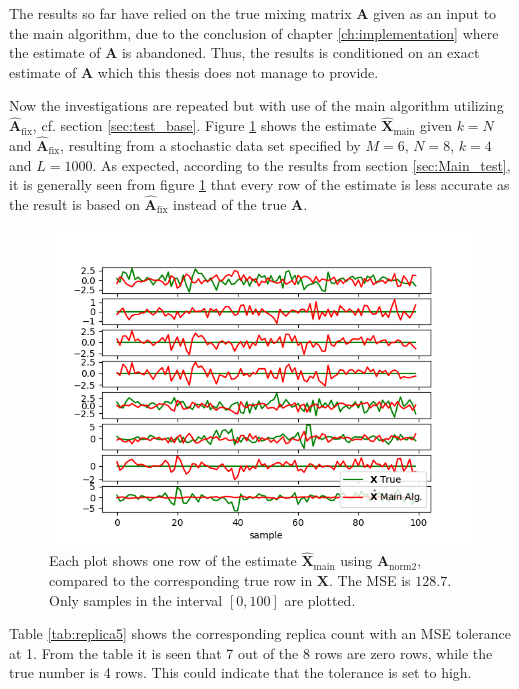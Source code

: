 \noindent
The results so far have relied on the true mixing matrix $\mathbf{A}$ given as an input to the main algorithm, due to the conclusion of chapter \ref{ch:implementation} where the estimate of $\mathbf{A}$ is abandoned. 
Thus, the results is conditioned on an exact estimate of $\mathbf{A}$ which this thesis does not manage to provide.

Now the investigations are repeated but with use of the main algorithm utilizing $\hat{\mathbf{A}}_{\text{fix}}$, cf. section \ref{sec:test_base}.
Figure \ref{fig:ktest5} shows the estimate $\hat{\mathbf{X}}_{\text{main}}$ given $k=N$ and $\hat{\textbf{A}}_{\text{fix}}$, resulting from a stochastic data set specified by $M = 6$, $N = 8$, $k = 4$ and $L = 1000$.
As expected, according to the results from section \ref{sec:Main_test}, it is generally seen from figure \ref{fig:ktest5} that every row of the estimate is less accurate as the result is based on $\hat{\mathbf{A}}_{\text{fix}}$ instead of the true $\mathbf{A}$. 
\begin{figure}[H]
\centering
\includegraphics[scale=0.5]{figures/ch_estimate/k_test5.png}
\caption{Each plot shows one row of the estimate $\hat{\mathbf{X}}_{\text{main}}$ using $\mathbf{A}_{\text{norm2}}$, compared to the corresponding true row in $\mathbf{X}$. The MSE is $128.7$. Only samples in the interval $[0,100]$ are plotted.}
\label{fig:ktest5}
\end{figure}
\noindent
Table \ref{tab:replica5} shows the corresponding replica count with an MSE tolerance at 1. 
From the table it is seen that 7 out of the 8 rows are zero rows, while the true number is 4 rows. 
This could indicate that the tolerance is set to high. 
